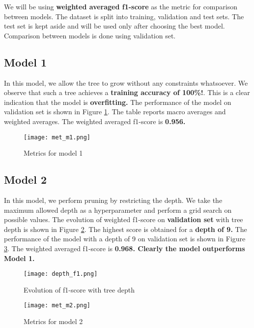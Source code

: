 \documentclass[conference]{IEEEtran}
\begin{document}
We will be using \textbf{weighted averaged f1-score} as the metric for comparison between models. The dataset is split into training, validation and test sets. The test set is kept aside and will be used only after choosing the best model. Comparison between models is done using validation set.

\subsection{Model 1}

In this model, we allow the tree to grow without any constraints whatsoever. We observe that such a tree achieves a \textbf{training accuracy of 100\%!}. This is a clear indication that the model is \textbf{overfitting.} The performance of the model on validation set is shown in Figure \ref{met_m1}. The table reports macro averages and weighted averages. The weighted averaged f1-score is \textbf{0.956.}

\begin{figure}[tbh]
\centering
\texttt{[image: met\_m1.png]}
\caption{Metrics for model 1 }
\label{met_m1}
\end{figure}



\subsection{Model 2}

In this model, we perform pruning by restricting the depth. We take the maximum allowed depth as a hyperparameter and perform a grid search on possible values. The evolution of weighted f1-score on \textbf{validation set} with tree depth is shown in Figure \ref{depth_f1}. The highest score is obtained for a \textbf{depth of 9.} The performance of the model with a depth of 9 on validation set is shown in Figure \ref{met_m2}. The weighted averaged f1-score is \textbf{0.968. Clearly the model outperforms Model 1.}

\begin{figure}[tbh]
\centering
\texttt{[image: depth\_f1.png]}
\caption{Evolution of f1-score with tree depth}
\label{depth_f1}
\end{figure}

\begin{figure}[tbh]
\centering
\texttt{[image: met\_m2.png]}
\caption{Metrics for model 2 }
\label{met_m2}
\end{figure}
\end{document}
